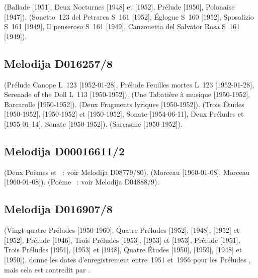 \Chopin{} (Ballade  [1951], Deux Nocturnes  
[1948] et   [1952], Prélude   [1950],
Polonaise  [1947]).
\Liszt{} (Sonetto~123 del Petrarca S~161  [1952], Églogue S~160
 [1952], Sposalizio S~161  [1949], Il penseroso S~161
 [1949], Canzonetta del Salvator Rosa S~161  [1949]).

\subsection{Melodija D016257/8}

\Debussy{} (Prélude Canope L~123  [1952-01-28], Prélude Feuilles
mortes L~123  [1952-01-28], Serenade of the Doll L~113
 [1950-1952]).
\Liadov{} (Une Tabatière à musique  [1950-1952], Barcarolle
 [1950-1952]).
\Blumenfeld{} (Deux Fragments lyriques  [1950-1952]).
\Scriabine{} (Trois Études   [1950-1952], 
 [1950-1952] et   [1950-1952], Sonate
 [1954-06-11], Deux Préludes   et 
 [1955-01-14], Sonate  [1950-1952]).
\Prokofiev{} (Sarcasme   [1950-1952]).

\subsection{Melodija D00016611/2}

\Scriabine{} (Deux Poèmes   et  ~:
voir Melodija D08779/80).
\Scriabine{} (Morceau   [1960-01-08], Morceau 
 [1960-01-08]).
\Scriabine{} (Poème ~: voir Melodija D04888/9).

\subsection{Melodija D016907/8}

\Scriabine{} (Vingt-quatre Préludes  [1950-1960], Quatre Préludes
  [1952],   [1948], 
 [1952] et   [1952], Prélude 
 [1946], Trois Préludes   [1953], 
 [1953] et   [1953], Prélude 
 [1951], Trois Préludes   [1951], 
 [1953] et   [1948], Quatre Études 
 [1950],   [1959],   [1948]
et   [1950]).
\INikonovich{} \citep[voir][p.~4]{Nikonovich11} donne les dates
d'enregistrement entre~1951 et~1956 pour les Préludes , mais cela
est contredit par \FMalik{} \citep[voir][p.~72]{Malik}.

